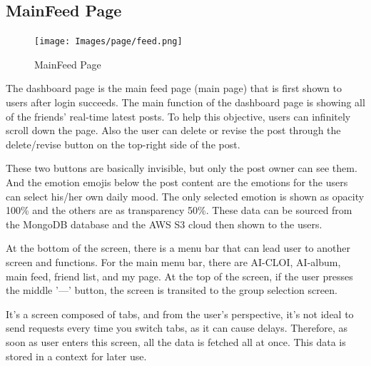 \documentclass[conference]{IEEEtran}
\begin{document}
   \subsection{MainFeed Page}
        \begin{figure}[htbp]
            \centerline{\texttt{[image: Images/page/feed.png]}}
            \caption{MainFeed Page}
            \label{fig}
        \end{figure}
        The dashboard page is the main feed page (main page) that is first shown to users after login succeeds. The main function of the dashboard page is showing all of the friends' real-time latest posts. To help this objective, users can infinitely scroll down the page. Also the user can delete or revise the post through the delete/revise button on the top-right side of the post.

        These two buttons are basically invisible, but only the post owner can see them. And the emotion emojis below the post content are the emotions for the users can select his/her own daily mood. The only selected emotion is shown as opacity 100\% and the others are as transparency 50\%. These data can be sourced from the MongoDB database and the AWS S3 cloud then shown to the users.

        At the bottom of the screen, there is a menu bar that can lead user to another screen and functions. For the main menu bar, there are AI-CLOI, AI-album, main feed, friend list, and my page. At the top of the screen, if the user presses the middle '—' button, the screen is transited to the group selection screen.

        It's a screen composed of tabs, and from the user's perspective, it's not ideal to send requests every time you switch tabs, as it can cause delays. Therefore, as soon as user enters this screen, all the data is fetched all at once. This data is stored in a context for later use.
\end{document}

